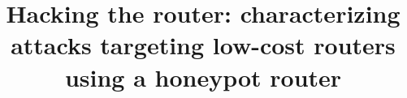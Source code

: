 \documentclass{sig-alternate-br}
\begin{document}
%

\title{Hacking the router: characterizing attacks targeting low-cost routers using a honeypot router}

%
%
%
%
%
\end{document}
